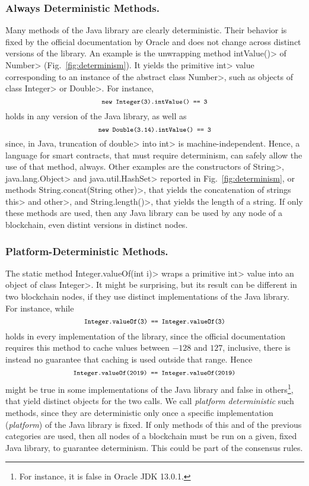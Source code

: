 \subsubsection*{Always Deterministic Methods.}
Many methods of the Java library are clearly deterministic. Their behavior is fixed
by the official documentation by Oracle
and does not change across distinct versions of the library. An example is the unwrapping
method \<intValue()> of \<Number> (Fig.~\ref{fig:determinism}). It yields
the primitive \<int> value corresponding to an instance of the abstract class \<Number>, such
as objects of class \<Integer> or \<Double>. For instance,
\[
\<new Integer(3).intValue() == 3>
\]
holds in any version of the Java library, as well as
\[
\<new Double(3.14).intValue() == 3>
\]
since, in Java, truncation of \<double> into \<int> is machine-independent.
Hence, a language for smart contracts, that must require determinism,
can safely allow the use of that method, always. Other examples
are the constructors of \<String>, \<java.lang.Object> and \<java.util.HashSet>
reported in Fig.~\ref{fig:determinism}, or methods
\<String.concat(String other)>, that yields the concatenation of strings \<this> and \<other>,
and \<String.length()>, that yields the length of a string.
If only these methods are used, then any Java library can be used by any node of a blockchain,
even distint versions in distinct nodes.

\subsubsection*{Platform-Deterministic Methods.}
The static method \<Integer.valueOf(int i)> wraps
a primitive \<int> value into an object of class \<Integer>. It might be surprising,
but its result can be different in two blockchain nodes, if they
use distinct implementations of the Java library. For instance, while
\[
\<Integer.valueOf(3) == Integer.valueOf(3)>
\]
holds in every implementation of the library, since the official documentation requires this method
to cache values between $-128$ and $127$, inclusive, there is instead no guarantee that caching is
used outside that range. Hence
\[
\<Integer.valueOf(2019) == Integer.valueOf(2019)>
\]
might be true in some implementations of the Java library
and false in others\footnote{For instance, it is false in Oracle JDK 13.0.1.}, that yield distinct objects for the two calls.
We call \emph{platform deterministic} such methods, since they are deterministic only once a specific
implementation (\emph{platform}) of the Java library is fixed.
If only methods of this and of the previous categories are used, then
all nodes of a blockchain must be run on a given, fixed Java library, to guarantee
determinism. This could be part of the consensus rules.

